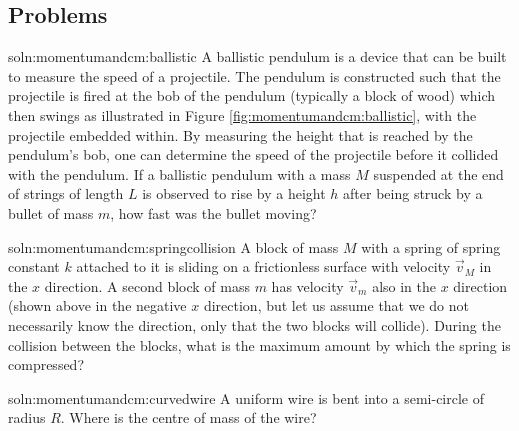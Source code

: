 \subsection{Problems}

\begin{problem}{soln:momentumandcm:ballistic}{\label{prob:momencumandcm:ballistic} 
A ballistic pendulum is a device that can be built to measure the speed of a projectile. The pendulum is constructed such that the projectile is fired at the bob of the pendulum (typically a block of wood) which then swings as illustrated in Figure \ref{fig:momentumandcm:ballistic}, with the projectile embedded within. By measuring the height that is reached by the pendulum's bob, one can determine the speed of the projectile before it collided with the pendulum. If a ballistic pendulum with a mass $M$ suspended at the end of strings of length $L$ is observed to rise by a height $h$ after being struck by a bullet of mass $m$, how fast was the bullet moving?}
\end{problem}

\begin{problem}{soln:momentumandcm:springcollision}{\label{prob:momencumandcm:springcollision}  A block of mass $M$ with a spring of spring constant $k$ attached to it is sliding on a frictionless surface with velocity $\vec v_M$ in the $x$ direction. A second block of mass $m$ has velocity $\vec v_m$ also in the $x$ direction (shown above in the negative $x$ direction, but let us assume that we do not necessarily know the direction, only  that the two blocks will collide). During the collision between the blocks, what is the maximum amount by which the spring is compressed?
}
\end{problem}

\begin{problem}{soln:momentumandcm:curvedwire}{\label{prob:momencumandcm:curvedwire} A uniform wire is bent into a semi-circle of radius $R$. Where is the centre of mass of the wire?}
\end{problem}

\newpage
